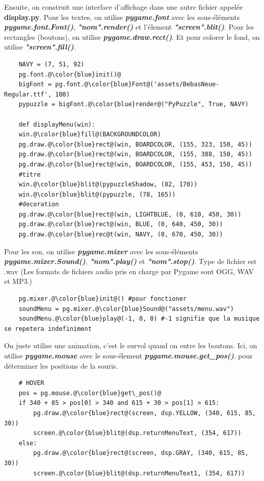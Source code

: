 \documentclass[a4paper]{report}
\begin{document}
Ensuite, on construit une interface d'affichage dans une autre fichier appelée \textbf{display.py}. 
Pour les textes, on utilise \textbf{\textit{pygame.font}} avec les sous-éléments \textbf{\textit{pygame.font.Font()}}, \textbf{\textit{"nom".render()}} et l'élement \textbf{\textit{"screen".blit()}}. 
Pour les rectangles (boutons), on utilise \textbf{\textit{pygame.draw.rect()}}.
Et pour colorer le fond, on utilise \textbf{\textit{"screen".fill()}}.

\begin{lstlisting}
    NAVY = (7, 51, 92)
    pg.font.@\color{blue}init()@
    bigFont = pg.font.@\color{blue}Font@('assets/BebasNeue-Regular.ttf', 100)
    pypuzzle = bigFont.@\color{blue}render@("PyPuzzle", True, NAVY)

    def displayMenu(win):
    win.@\color{blue}fill@(BACKGROUNDCOLOR)
    pg.draw.@\color{blue}rect@(win, BOARDCOLOR, (155, 323, 150, 45))
    pg.draw.@\color{blue}rect@(win, BOARDCOLOR, (155, 388, 150, 45))
    pg.draw.@\color{blue}rect@(win, BOARDCOLOR, (155, 453, 150, 45))
    #titre
    win.@\color{blue}blit@(pypuzzleShadow, (82, 170))
    win.@\color{blue}blit@(pypuzzle, (78, 165))
    #decoration
    pg.draw.@\color{blue}rect@(win, LIGHTBLUE, (0, 610, 450, 30))
    pg.draw.@\color{blue}rect@(win, BLUE, (0, 640, 450, 30))
    pg.draw.@\color{blue}rec@t(win, NAVY, (0, 670, 450, 30))
\end{lstlisting}

Pour les son, on utilise \textbf{\textit{pygame.mixer}} avec les sous-éléments \textbf{\textit{pygame.mixer.Sound()}}, \textbf{\textit{"nom".play()}} et \textbf{\textit{"nom".stop()}}.
Type de fichier est .wav (Les formats de fichiers audio pris en charge par Pygame sont OGG, WAV et MP3.)
\begin{lstlisting}
    pg.mixer.@\color{blue}init@() #pour fonctioner
    soundMenu = pg.mixer.@\color{blue}Sound@("assets/menu.wav")
    soundMenu.@\color{blue}play@(-1, 0, 0) #-1 signifie que la musique se repetera indefiniment
\end{lstlisting}

On juste utilise une animation, c'est le survol quand on entre les boutons.
Ici, on utilise \textbf{\textit{pygame.mouse}} avec le sous-élement \textbf{\textit{pygame.mouse.get\_pos()}}.
pour déterminer les positions de la souris.
\begin{lstlisting}
    # HOVER
    pos = pg.mouse.@\color{blue}get\_pos()@
    if 340 + 85 > pos[0] > 340 and 615 + 30 > pos[1] > 615:
        pg.draw.@\color{blue}rect@(screen, dsp.YELLOW, (340, 615, 85, 30))
        screen.@\color{blue}blit@(dsp.returnMenuText, (354, 617))
    else:
        pg.draw.@\color{blue}rect@(screen, dsp.GRAY, (340, 615, 85, 30))
        screen.@\color{blue}blit@(dsp.returnMenuText1, (354, 617))
\end{lstlisting}
\end{document}

